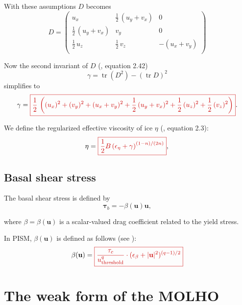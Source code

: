 \documentclass{amsart}
\DeclareMathOperator{\Tr}{tr}
\newcommand{\U}{\mathbf{u}}
\newcommand{\T}{\boldsymbol{\tau}}
\newcommand{\betaU}{\beta(\U)}
\newcommand{\basalshearstress}[1]{\T_{b#1}}
\newcommand{\taub}{\basalshearstress{}}
\newcommand{\highlight}[1]{{\color{red!80!black} \fbox{$ \displaystyle #1 $} }}
\begin{document}
With these assumptions $D$ becomes
\begin{equation*}
  D =
  \begin{pmatrix}
    u_x & \frac{1}{2}\,(u_y + v_x) & 0\\
    \frac{1}{2}\,(u_y + v_x) & v_y & 0\\
    \frac{1}{2}\,u_z & \frac{1}{2}\,v_z & - (u_x + v_y)\\
  \end{pmatrix}
\end{equation*}

Now the second invariant of $D$ (\cite{GreveBlatter2009}, equation 2.42)
\begin{equation*}
  \gamma = \Tr (D^2) - \left( \Tr D \right)^2
\end{equation*}
simplifies to
\begin{equation}
  \label{eq:4}
  \gamma = \highlight{ \frac{1}{2}\, \left( (u_x)^2 + (v_y)^2 + (u_x + v_y)^2 + \frac{1}{2}\,(u_y + v_x)^2 + \frac{1}{2}\,(u_z)^2 + \frac{1}{2}\,(v_z)^2 \right) }.
\end{equation}

We define the regularized effective viscosity of ice $\eta$ (\cite{SchoofStream}, equation 2.3):
\begin{equation}
  \label{eq:5}
  \eta = \highlight{ \frac{1}{2} B \left( \epsilon_{\eta} + \gamma \right)^{(1 - n) / (2n)} },\\
\end{equation}

\subsection{Basal shear stress}
\label{sec:beta}

The basal shear stress is defined by
\begin{equation}
  \label{eq:6}
  \taub =  - \betaU \U,
\end{equation}

where $\beta = \betaU$ is a scalar-valued drag coefficient related to the yield stress.

In PISM, $\betaU$ is defined as follows (see \cite{SchoofHindmarsh}):
\begin{equation}
  \label{eq:7}
  \betaU = \highlight{ \frac{\tau_c}{u_{\text{threshold}}^q}\cdot (\epsilon_{\beta} + |\U|^2)^{(q - 1) / 2} }
\end{equation}


\section{The weak form of the MOLHO}
\end{document}
